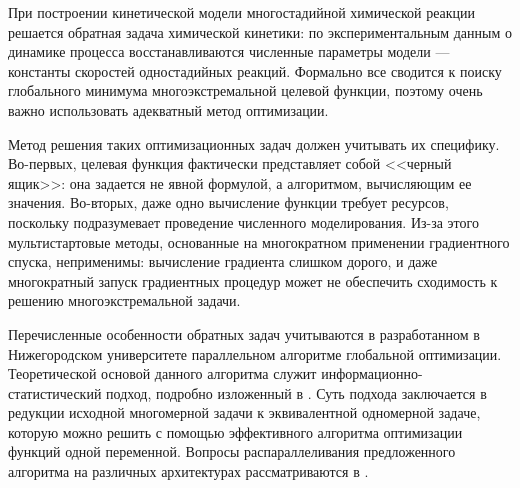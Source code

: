 \documentclass{cmi}
\begin{document}
При построении кинетической модели многостадийной химической реакции решается обратная задача химической кинетики: по экспериментальным данным о динамике процесса восстанавливаются численные параметры модели --- константы скоростей одностадийных реакций. Формально все сводится к поиску глобального минимума многоэкстремальной целевой функции, поэтому очень важно использовать адекватный метод оптимизации.


Метод решения таких оптимизационных задач должен учитывать их специфику. Во-первых, целевая функция фактически представляет собой <<черный ящик>>: она задается не явной формулой, а алгоритмом, вычисляющим ее значения. Во-вторых, даже одно вычисление функции требует ресурсов, поскольку подразумевает проведение численного моделирования. Из-за этого мультистартовые методы, основанные на многократном применении градиентного спуска, неприменимы: вычисление градиента слишком дорого, и даже многократный запуск градиентных процедур может не обеспечить сходимость к решению многоэкстремальной задачи.

Перечисленные особенности обратных задач учитываются в разработанном в Нижегородском университете параллельном алгоритме глобальной оптимизации. Теоретической основой данного алгоритма служит информационно-статистический подход, подробно изложенный в . Суть подхода заключается в редукции исходной многомерной задачи к эквивалентной одномерной задаче, которую можно решить с помощью эффективного алгоритма оптимизации функций одной переменной. Вопросы распараллеливания предложенного алгоритма на различных архитектурах рассматриваются в .
\end{document}
